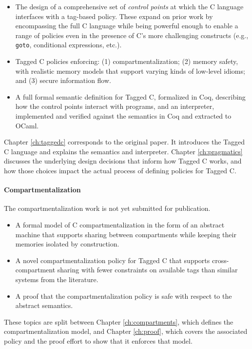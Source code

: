 \documentclass{report}
\begin{document}
\begin{itemize}
\item The design of a comprehensive set of {\em control points} at which the C language interfaces
  with a tag-based policy. These expand on prior work by encompassing the full C language
  while being powerful enough to enable a range of policies even in the presence of C's more
  challenging constructs (e.g., {\tt goto}, conditional expressions, etc.).
\item Tagged C policies enforcing: (1) compartmentalization;
  (2) memory safety, with realistic memory models that support varying kinds of low-level idioms;
  and (3) secure information flow.
\item A full formal semantic definition for Tagged C, formalized in Coq, describing how the
  control points interact with programs, and an interpreter, implemented and verified against
  the semantics in Coq and extracted to OCaml.
\end{itemize}

Chapter \ref{ch:taggedc} corresponds to the original paper. It introduces the Tagged C language
and explains the semantics and interpreter. Chapter \ref{ch:pragmatics} discusses the underlying
design decisions that inform how Tagged C works, and how those choices
impact the actual process of defining policies for Tagged C.

\paragraph{Compartmentalization}

The compartmentalization work is not yet submitted for publication.

\begin{itemize}
\item A formal model of C compartmentalization in the form of an abstract machine that
  supports sharing between compartments while keeping their memories isolated by construction.
\item A novel compartmentalization policy for Tagged C that supports cross-compartment
  sharing with fewer constraints on available tags than similar systems from the literature.
\item A proof that the compartmentalization policy is safe with respect to the abstract semantics.
\end{itemize}

These topics are split between Chapter \ref{ch:compartments}, which defines the compartmentalization
model, and Chapter \ref{ch:proof}, which covers the associated policy and the proof effort to show that
it enforces that model.
\end{document}
